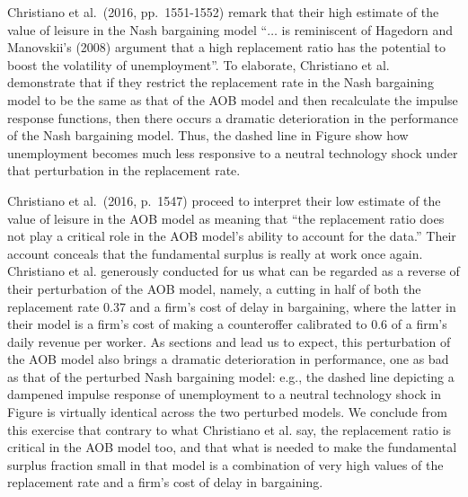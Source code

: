  Christiano et al.\ (2016, pp.~1551-1552) remark that
   their high estimate of the value of leisure in the
Nash bargaining model ``$\ldots$  is reminiscent of Hagedorn
and Manovskii's (2008) argument that a high replacement ratio has
the potential to boost the volatility of unemployment''.
To elaborate, Christiano et al. demonstrate  that if they restrict the replacement
rate in the Nash bargaining model to be the same as that of the
AOB model and then recalculate the impulse response functions, then there occurs
a dramatic deterioration in the performance of the Nash
bargaining model. Thus,  the dashed line in Figure 
show how  unemployment becomes much less responsive to
a neutral technology shock under that perturbation in the replacement rate.

Christiano et al.\ (2016, p.~1547) proceed to interpret  their low estimate of the value of leisure in the
AOB model as meaning that ``the replacement ratio does not play a critical role
in the AOB model's ability to account for the data.''
Their account conceals that the fundamental surplus  is really at work once again. Christiano et al.
 generously conducted for us  what can be regarded as a reverse of their perturbation of the AOB model, namely, a cutting in half
of both the replacement rate 0.37 and a firm's cost of delay
in bargaining, where the latter in their model is a firm's
cost of  making a counteroffer  calibrated to 0.6 of a firm's
daily revenue per worker.
As  sections
 and  lead us to expect, this
perturbation of the AOB model also brings a dramatic
deterioration in performance, one as bad as that of the perturbed Nash
bargaining model: e.g., the dashed line depicting a
dampened impulse response of unemployment to a neutral
technology shock in Figure  
is virtually identical across the two perturbed models.
We conclude from this exercise that contrary to what Christiano et al. say,  the replacement ratio is  critical
in the AOB model too, and that  what is needed to make the fundamental surplus fraction small
in that model
is a combination of very high
values of the replacement rate and a firm's cost of delay in
bargaining.









